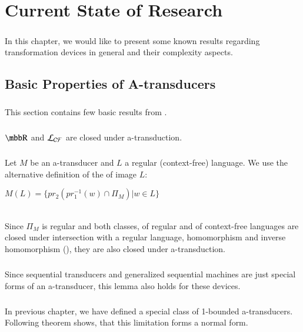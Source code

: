 \chapter{Current State of Research}
\label{chap:currentState}

\paragraph{}
In this chapter, we would like to present some known results regarding transformation devices in general and their complexity aspects.

\section{Basic Properties of A-transducers}
\paragraph{}
This section contains few basic results from \cite{gin:AATPFL}.

\paragraph{}
\clema $\R $ and $\CF $ are closed under a-transduction.

\paragraph{}
\dokaz Let $M$ be an a-transducer and $L$ a regular (context-free) language. We use the alternative definition of the of image $L$:\\
\centerline{$M(L) = \{ pr_{2}(pr_{1}^{-1}(w) \cap \Pi_{M}) | w \in L \}$} \\
Since $\Pi_{M}$ is regular and both classes, of regular and of context-free languages are closed under intersection with a regular language, homomorphism and inverse homomorphism (\cite{hopcroft:fola}), they are also closed under a-transduction. \square

\paragraph{}
\cdosledok Since sequential transducers and generalized sequential machines are just special forms of an a-transducer, this lemma also holds for these devices.

\paragraph{}
In previous chapter, we have defined a special class of 1-bounded a-transducers. Following theorem shows, that this limitation forms a normal form.

